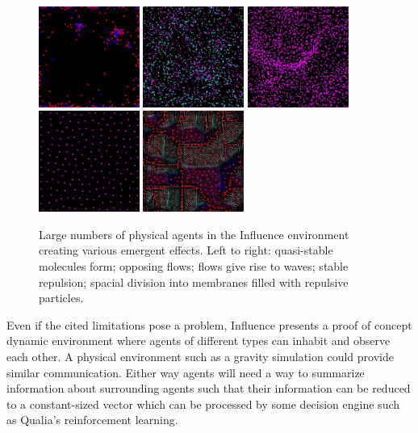 \documentclass{article}
\begin{document}
\begin{figure}
\centerline{
  \includegraphics[width=1.3in]{quasi-stable_molecules.jpg}
  \includegraphics[width=1.3in]{emergent_opposing_flows.jpg}
  \includegraphics[width=1.3in]{emerging_flows_one.jpg}
  \includegraphics[width=1.3in]{stable_repulsion.jpg}
  \includegraphics[width=1.3in]{membranes.jpg}}
  \caption{Large numbers of physical agents in the Influence
    environment creating various emergent effects. Left to right:
    quasi-stable molecules form; opposing flows; flows give rise to
    waves; stable repulsion; spacial division into membranes filled
    with repulsive particles.}
\label{fig:manyagents}
\end{figure}


Even if the cited limitations pose a problem, Influence presents a
proof of concept dynamic environment where agents of different types
can inhabit and observe each other.
A physical environment such as a gravity simulation could provide
similar communication.
Either way agents will need a way to summarize information about
surrounding agents such that their information can be reduced to a
constant-sized vector which can be processed by some decision engine
such as Qualia's reinforcement learning.
\end{document}
